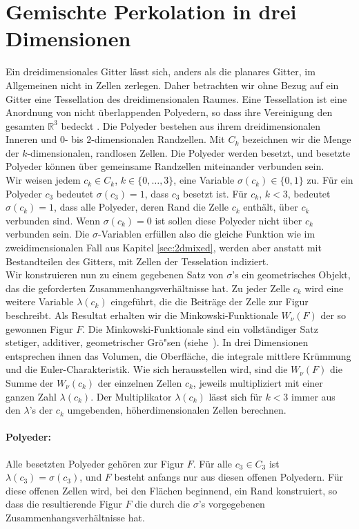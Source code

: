 \section{Gemischte Perkolation in drei Dimensionen}
Ein dreidimensionales Gitter l\"asst sich, anders als die planares Gitter, im Allgemeinen nicht in Zellen zerlegen. Daher betrachten wir ohne Bezug auf ein Gitter eine Tessellation des dreidimensionalen Raumes. Eine Tessellation ist eine Anordnung von nicht \"uberlappenden Polyedern, so dass ihre Vereinigung den gesamten $\mathbb{R}^3$ bedeckt \cite{Weygaert:91}. Die Polyeder bestehen aus ihrem dreidimensionalen Inneren und 0- bis $2$-dimensionalen Randzellen. Mit $C_k$ bezeichnen wir die Menge der $k$-dimensionalen, randlosen Zellen. Die Polyeder werden besetzt, und besetzte Polyeder k\"onnen \"uber gemeinsame Randzellen miteinander verbunden sein. 
\\Wir weisen jedem $c_k\in C_k$, $k\in \{ 0,\ldots, 3\}$, eine Variable $\sigma(c_k)\in \{0,1\}$ zu. F\"ur ein Polyeder $c_3$ bedeutet $\sigma(c_3)=1$, dass $c_3$ besetzt ist. F\"ur $c_k$, $k<3$, bedeutet $\sigma(c_k)=1 $, dass alle Polyeder, deren Rand die Zelle $c_k$ enth\"alt, \"uber $c_k$ verbunden sind. Wenn $\sigma(c_k)=0$ ist sollen diese Polyeder nicht \"uber $c_k$ verbunden sein. Die $\sigma$-Variablen erf\"ullen also die gleiche Funktion wie im zweidimensionalen Fall aus Kapitel \ref{sec:2dmixed}, werden aber anstatt mit Bestandteilen des Gitters, mit Zellen der Tesselation indiziert.
\\Wir konstruieren nun zu einem gegebenen Satz von $\sigma$'s ein geometrisches Objekt, das die geforderten Zusammenhangsverh\"altnisse hat. Zu jeder Zelle $c_k$ wird eine weitere Variable $\lambda(c_k)$ eingef\"uhrt, die die Beitr\"age der Zelle zur Figur beschreibt. Als Resultat erhalten wir die Minkowski-Funktionale $W_\nu(F)$ der so gewonnen Figur $F$. Die Minkowski-Funktionale sind ein vollst\"andiger Satz stetiger, additiver, geometrischer Gr\"o"sen \mbox{(siehe \cite{Mecke:94}).} In drei Dimensionen entsprechen ihnen das Volumen, die Oberfl\"ache, die integrale mittlere Kr\"ummung und die Euler-Charakteristik. Wie sich herausstellen wird, sind die $W_\nu(F)$ die Summe der $W_\nu(c_k)$ der einzelnen Zellen $c_k$, jeweils multipliziert mit einer ganzen Zahl $\lambda(c_k)$. Der Multiplikator $\lambda(c_k)$ l\"asst sich f\"ur $k<3$ immer aus den $\lambda$'s der $c_k$ umgebenden, h\"oherdimensionalen Zellen berechnen. 
\paragraph{Polyeder:}Alle besetzten Polyeder geh\"oren zur Figur $F$. F\"ur alle $c_3\in C_3$ ist $\lambda(c_3)=\sigma(c_3)$, und $F$ besteht anfangs nur aus diesen offenen Polyedern. F\"ur diese offenen Zellen wird, bei den Fl\"achen beginnend, ein Rand konstruiert, so dass die resultierende Figur $F$ die durch die $\sigma$'s vorgegebenen Zusammenhangsverh\"altnisse hat. 
